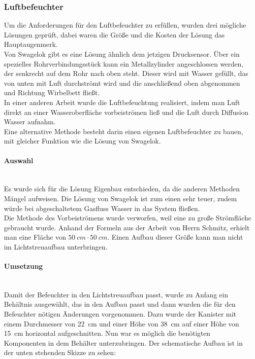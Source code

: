 \subsubsection{Luftbefeuchter}

Um die Anforderungen für den Luftbefeuchter zu erfüllen, wurden drei mögliche Lösungen geprüft, dabei waren die Größe und die Kosten der Lösung das Hauptaugenmerk. \\
Von Swagelok gibt es eine Lösung ähnlich dem jetzigen Drucksensor. Über ein spezielles Rohrverbindungsstück kann ein Metallzylinder angeschlossen werden, der senkrecht auf dem Rohr nach oben steht. Dieser wird mit Wasser gefüllt, das von unten mit Luft durchströmt wird und die anschließend oben abgenommen und Richtung Wirbelbett fließt. \\
In einer anderen Arbeit \cite{Fallturmexperiment} wurde die Luftbefeuchtung realisiert, indem man Luft direkt an einer  Wasseroberfläche vorbeiströmen ließ und die Luft durch Diffusion Wasser aufnahm. \\
Eine alternative Methode besteht darin einen eigenen Luftbefeuchter zu bauen, mit gleicher Funktion wie die Lösung von Swagelok. 


\paragraph{Auswahl}

\hfill \\

Es wurde sich für die Lösung Eigenbau entschieden, da die anderen Methoden Mängel aufweisen. Die Lösung von Swagelok ist zum einen sehr teuer, zudem würde bei abgeschaltetem Gasfluss Wasser in das System fließen. \\
Die Methode des Vorbeiströmens wurde verworfen, weil eine zu große Strömfläche gebraucht wurde. Anhand der Formeln aus der Arbeit von Herrn Schmitz, erhielt man eine Fläche von $\SI{50}{cm} \cdot \SI{50}{cm}$. Einen Aufbau dieser Größe kann man nicht im Lichtstreuaufbau unterbringen.

\paragraph{Umsetzung}

\hfill \\

Damit der Befeuchter in den Lichtstreuaufbau passt, wurde zu Anfang ein Behältnis ausgewählt, das in den Aufbau passt und dann wurden die für den Befeuchter nötigen Änderungen vorgenommen. Dazu wurde der Kanister mit einem Durchmesser von \SI{22}{cm} und einer Höhe von \SI{38}{cm} auf einer Höhe von \SI{15}{cm} horizontal aufgeschnitten. Nun war es möglich die benötigten Komponenten in dem Behälter unterzubringen. Der schematische Aufbau ist in der unten stehenden Skizze zu sehen: \\

